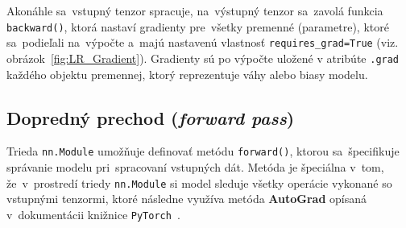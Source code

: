 Akonáhle sa~vstupný tenzor spracuje, na~výstupný tenzor sa~zavolá funkcia \texttt{backward()}, ktorá nastaví gradienty pre~všetky premenné (parametre), ktoré sa~podieľali na~výpočte a~majú nastavenú vlastnosť \texttt{requires\_grad=True} (viz. obrázok~\ref{fig:LR_Gradient}). Gradienty sú po výpočte uložené v atribúte \texttt{.grad} každého objektu premennej, ktorý reprezentuje váhy alebo biasy modelu.

\subsection{Dopredný prechod (\textit{forward pass})}\label{imp:forward_pass}
Trieda \texttt{nn.Module} umožňuje definovať metódu \texttt{forward()}, ktorou sa~špecifikuje správanie modelu pri~spracovaní vstupných dát. Metóda je špeciálna v~tom, že~v~prostredí triedy \texttt{nn.Module} si model sleduje všetky operácie vykonané so vstupnými tenzormi, ktoré následne využíva metóda \textbf{AutoGrad} opísaná v~dokumentácii knižnice \texttt{PyTorch}~\cite{AutoGrad, pytorch.autograd}.


